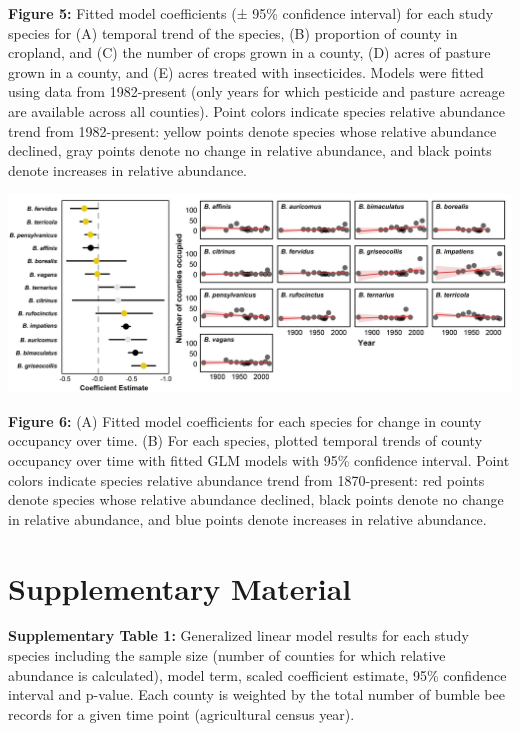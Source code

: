 \documentclass[11pt,]{article}
\begin{document}
\textbf{Figure 5:} Fitted model coefficients (± 95\% confidence
interval) for each study species for (A) temporal trend of the species,
(B) proportion of county in cropland, and (C) the number of crops grown
in a county, (D) acres of pasture grown in a county, and (E) acres
treated with insecticides. Models were fitted using data from
1982-present (only years for which pesticide and pasture acreage are
available across all counties). Point colors indicate species relative
abundance trend from 1982-present: yellow points denote species whose
relative abundance declined, gray points denote no change in relative
abundance, and black points denote increases in relative abundance.

\clearpage

\newpage

\includegraphics[width=1\textwidth,height=\textheight]{../ms_figs/fig6.png}

\textbf{Figure 6:} (A) Fitted model coefficients for each species for
change in county occupancy over time. (B) For each species, plotted
temporal trends of county occupancy over time with fitted GLM models
with 95\% confidence interval. Point colors indicate species relative
abundance trend from 1870-present: red points denote species whose
relative abundance declined, black points denote no change in relative
abundance, and blue points denote increases in relative abundance.

\clearpage

\newpage

\hypertarget{supplementary-material}{%
\section{Supplementary Material}\label{supplementary-material}}

\textbf{Supplementary Table 1:} Generalized linear model results for
each study species including the sample size (number of counties for
which relative abundance is calculated), model term, scaled coefficient
estimate, 95\% confidence interval and p-value. Each county is weighted
by the total number of bumble bee records for a given time point
(agricultural census year).
\end{document}
